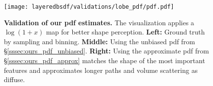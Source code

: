 \begin{figure}[!ht]
	\centering
	\texttt{[image: layeredbsdf/validations/lobe\_pdf/pdf.pdf]}
	\caption[Validation of our pdf estimates]{\label{fig:layeredbsdf:validate_pdf}
		\textbf{Validation of our pdf estimates.} The visualization applies a $\log(1+x)$ map for better shape perception. \textbf{Left:} Ground truth by sampling and binning. \textbf{Middle:} Using the unbiased pdf from \S\ref{sssec:ours_pdf_unbiased}. \textbf{Right:} Using the approximate pdf from \S\ref{sssec:ours_pdf_approx} matches the shape of the most important features and approximates longer paths and volume scattering as diffuse.
	}
\end{figure}
